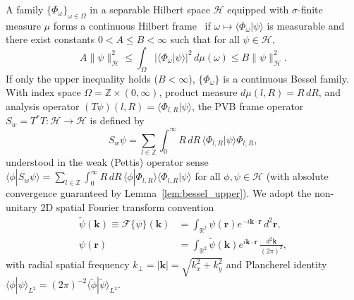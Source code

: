 \documentclass[aps,pra,reprint,nofootinbib,floatfix,longbibliography]{revtex4-2}
\theoremstyle{remark}
\newcommand{\braket}[2]{\langle #1 | #2 \rangle}
\newcommand{\norm}[1]{\lVert #1 \rVert}
\newcommand{\abs}[1]{\lvert #1 \rvert}
\begin{document}
A family $\{\Phi_\omega\}_{\omega\in\Omega}$ in a separable Hilbert space $\mathcal{H}$ equipped with $\sigma$-finite measure $\mu$ forms a continuous Hilbert frame~\cite{Duffin1952,Daubechies1990,Ali1993,Christensen2016} if $\omega \mapsto \braket{\Phi_\omega}{\psi}$ is measurable and there exist constants $0 < A \le B < \infty$ such that for all $\psi \in \mathcal{H}$,
\begin{equation}
A \norm{\psi}_{\mathcal{H}}^2 \le \int_\Omega \abs{\braket{\Phi_\omega}{\psi}}^2\,d\mu(\omega) \le B \norm{\psi}_{\mathcal{H}}^2.
\label{eq:frame_def}
\end{equation}
If only the upper inequality holds ($B < \infty$), $\{\Phi_\omega\}$ is a continuous Bessel family. With index space $\Omega = \mathbb{Z} \times (0,\infty)$, product measure $d\mu(l,R) = R\,dR$, and analysis operator $(T\psi)(l,R) = \braket{\Phi_{l,R}}{\psi}$, the PVB frame operator $S_w = T^* T : \mathcal{H} \to \mathcal{H}$ is defined by
\begin{equation}
S_w\psi = \sum_{l\in\mathbb{Z}} \int_0^\infty R\,dR\, \braket{\Phi_{l,R}}{\psi}\Phi_{l,R},
\label{eq:frame_op}
\end{equation}
understood in the weak (Pettis) operator sense $\braket{\phi}{S_w\psi} = \sum_{l\in\mathbb{Z}}\int_0^\infty R\,dR\,\braket{\phi}{\Phi_{l,R}}\braket{\Phi_{l,R}}{\psi}$ for all $\phi,\psi \in \mathcal{H}$ (with absolute convergence guaranteed by Lemma~\ref{lem:bessel_upper}). We adopt the non-unitary 2D spatial Fourier transform convention
\begin{align}
\widetilde{\psi}(\mathbf{k}) \equiv \mathcal{F}\{\psi\}(\mathbf{k}) &= \int_{\mathbb{R}^2} \psi(\mathbf{r}) e^{-i\mathbf{k}\cdot\mathbf{r}}\,d^2\mathbf{r}, \nonumber \\
\psi(\mathbf{r}) &= \int_{\mathbb{R}^2} \widetilde{\psi}(\mathbf{k}) e^{i\mathbf{k}\cdot\mathbf{r}}\,\frac{d^2\mathbf{k}}{(2\pi)^2},
\label{eq:ft_convention}
\end{align}
with radial spatial frequency $k_\perp = \abs{\mathbf{k}} = \sqrt{k_x^2 + k_y^2}$ and Plancherel identity $\braket{\phi}{\psi}_{L^2} = (2\pi)^{-2}\braket{\widetilde{\phi}}{\widetilde{\psi}}_{L^2}$.
\end{document}
